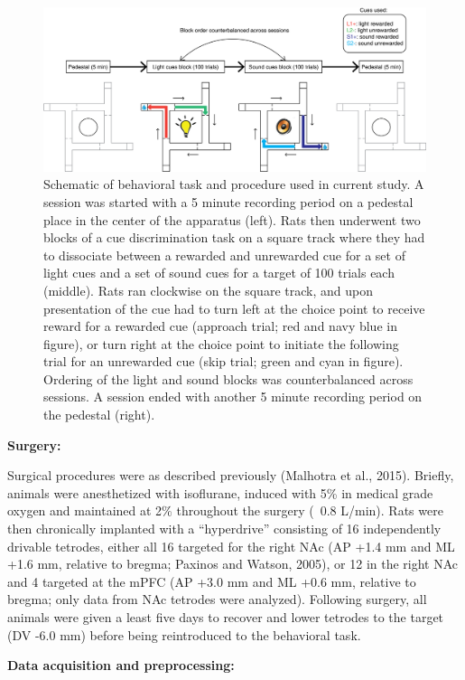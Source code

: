 \documentclass[11pt]{article}
\begin{document}
\begin{figure}[h]
\centering
\includegraphics[width=\textwidth]{Fig 2 - Schematic task.png}
\caption{Schematic of behavioral task and procedure used in current study. A session was started with a 5 minute recording period on a pedestal place in the center of the apparatus (left). Rats then underwent two blocks of a cue discrimination task on a square track where they had to dissociate between a rewarded and unrewarded cue for a set of light cues and a set of sound cues for a target of 100 trials each (middle). Rats ran clockwise on the square track, and upon presentation of the cue had to turn left at the choice point to receive reward for a rewarded cue (approach trial; red and navy blue in figure), or turn right at the choice point to initiate the following trial for an unrewarded cue (skip trial; green and cyan in figure). Ordering of the light and sound blocks was counterbalanced across sessions. A session ended with another 5 minute recording period on the pedestal (right).}
\label{fig:task}
\end{figure}

{\bf Surgery:}

Surgical procedures were as described previously (Malhotra et al., 2015). Briefly, animals were anesthetized with isoflurane, induced with 5\% in medical grade oxygen and maintained at 2\% throughout the surgery (~0.8 L/min). Rats were then chronically implanted with a “hyperdrive” consisting of 16 independently drivable tetrodes, either all 16 targeted for the right NAc (AP +1.4 mm and ML +1.6 mm, relative to bregma; Paxinos and Watson, 2005), or 12 in the right NAc and 4 targeted at the mPFC (AP +3.0 mm and ML +0.6 mm, relative to bregma; only data from NAc tetrodes were analyzed). Following surgery, all animals were given a least five days to recover and lower tetrodes to the target (DV -6.0 mm) before being reintroduced to the behavioral task.

{\bf Data acquisition and preprocessing:}
\end{document}

